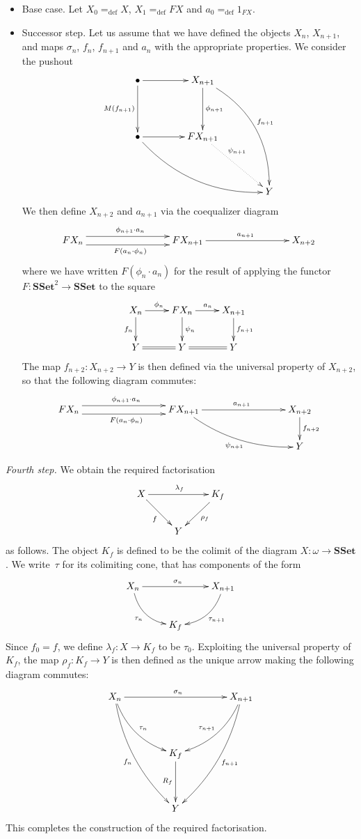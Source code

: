 \documentclass[reqno,10pt,a4paper,oneside]{amsart}
\theoremstyle{definition}
\newcommand{\defeq}{=_{\mathrm{def}}}
\newcommand{\co}{\colon}
\newcommand{\SSet}{\mathbf{SSet}}
\begin{document}
 \begin{itemize}
 \item Base case. Let $X_0 \defeq X$, $X_1 \defeq FX$ and $a_0 \defeq 1_{FX}$.
 \item Successor step. Let us assume that we have defined the objects $X_n$, $X_{n+1}$, and maps
 $\sigma_n$, $f_n$, $f_{n+1}$ and  $a_{n}$ with the appropriate 
 properties. We consider the pushout
 \[
   \xymatrix@C=1.5cm@R=1.5cm{
 \bullet \ar[r]  \ar[d]_{M(f_{n+1})} & X_{n+1} \ar[d]^{\phi_{n+1}} \ar@/^1.8pc/[ddr]^{f_{n+1}} \\
\bullet \ar[r] \ar@/_1.5pc/[drr]  & FX_{n+1}\ar@{.>}[dr]^-(.3){\psi_{n+1}} \\ 
   & & Y  }
 \]
We then define $X_{n+2}$ and $a_{n+1}$ via  the coequalizer diagram
 \[
 \xymatrix@=3cm{
 FX_n \ar@<1ex>[r]^{\phi_{n+1}  \cdot a_n}  \ar@<-1ex>[r]_{ F(a_n \cdot \phi_n)} & 
 F X_{n+1}   \ar[r]^{a_{n+1}} & X_{n+2} }
 \]
 where we have written $F(\phi_n \cdot a_n)$ for the result of applying the
 functor $F \co \SSet^2 \to \SSet$ to the square
 \[
  \xymatrix{
 X_n \ar[r]^{\phi_n} \ar[d]_{f_n} & FX_n \ar[d]^{\psi_n}  \ar[r]^{a_n} & X_{n+1} \ar[d]^{f_{n+1}}  \\ 
 Y \ar@{=}[r] & Y \ar@{=}[r] & Y }
 \]
 The map $f_{n+2} \co X_{n+2} \to Y$ is then defined via the universal property of $X_{n+2}$,
 so that the following diagram commutes:
 \[
 \xymatrix@C=3cm{
 FX_n \ar@<1ex>[r]^{\phi_{n+1}  \cdot a_n}  \ar@<-1ex>[r]_{ F(a_n \cdot \phi_{n})} & 
 F X_{n+1}   \ar[r]^{a_{n+1}} \ar@/_1pc/[dr]_{\psi_{n+1}} & X_{n+2}  \ar[d]^{f_{n+2}}  \\ 
  & & Y }
 \] 
 \end{itemize}
 
 \medskip
 
 \noindent
 \emph{Fourth step.}  We obtain the required factorisation
\[
\xymatrix{
X \ar[dr]_{f} \ar[rr]^{\lambda_f} & & K_f \ar[dl]^{\rho_f} \\
 & Y & }
 \]
as follows. The object $K_f$ is defined to be the colimit of the diagram $X \co \omega \to \SSet$. We write~$\tau$
for its colimiting cone, that has components of the form
 \[
 \xymatrix{
  X_n   \ar@/_1pc/[dr]_-{\tau_n}  \ar[rr]^{\sigma_n} &   & X_{n+1} \ar@/^1pc/[dl]^-{\tau_{n+1}}   \\
   &  K_f &  }
  \]
Since $f_0 = f$, we define $\lambda_f \co X \to K_f$  to be $\tau_0$.
Exploiting the universal property of $K_f$, the map $\rho_f \co K_f \to Y$ is then defined as 
the unique arrow making the following diagram commutes:
\[
 \xymatrix@=1.5cm{
  X_n   \ar@/_1pc/[dr]^-{\tau_n}  \ar[rr]^{\sigma_n} \ar@/_1pc/[ddr]_{f_n} &   & X_{n+1} \ar@/^1pc/[dl]_-{\tau_{n+1}}  \ar@/^1pc/[ddl]^{f_{n+1}}  \\
   &  K_f \ar[d]_{R_f}  &  \\
    & Y & }
  \]
  This completes the construction of the required factorisation. 
   
\end{document}
